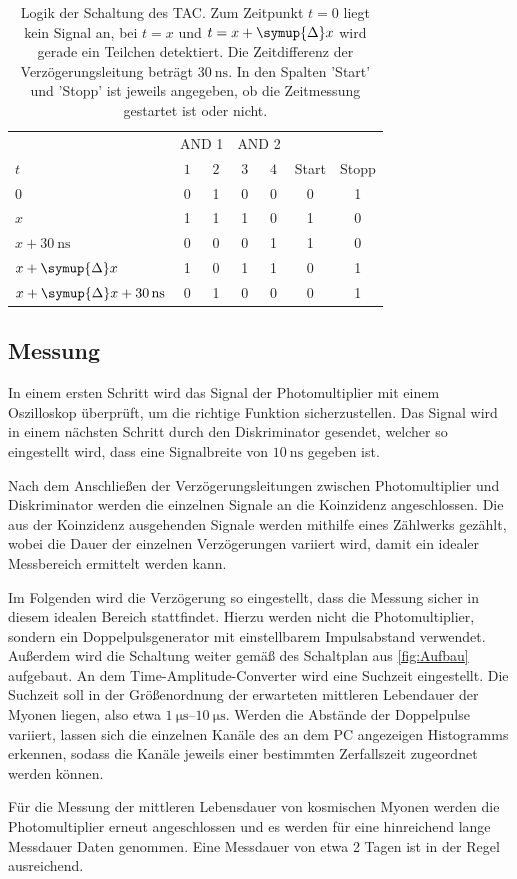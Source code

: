  \begin{table}
    \centering
    \caption{Logik der Schaltung des TAC. Zum Zeitpunkt $t=0$ liegt kein Signal an, bei $t=x$ und $t=x+\symup{\Delta}x$ wird gerade ein Teilchen detektiert. %
    Die Zeitdifferenz der Verzögerungsleitung beträgt $\qty{30}{\nano\second}$. In den Spalten 'Start' und 'Stopp' ist jeweils angegeben, ob die Zeitmessung %
    gestartet ist oder nicht.}
    \label{tab:Logik}
    \begin{tabular}{l | c c | c c | c c}
      \toprule
      {} & \multicolumn{2}{c|}{AND 1} & \multicolumn{2}{c|}{AND 2} & {} & {} \\
      $t$ & $1$ & $2$ & $3$ & $4$ & Start & Stopp \\
      \midrule
      $0$                                               & 0 & 1 & 0 & 0 & 0 & 1 \\
      $x$                                               & 1 & 1 & 1 & 0 & 1 & 0 \\
      {$x + \qty{30}{\nano\second}$}                    & 0 & 0 & 0 & 1 & 1 & 0 \\
      {$x + \symup{\Delta}x$}                           & 1 & 0 & 1 & 1 & 0 & 1 \\
      {$x + \symup{\Delta}x + \qty{30}{\nano\second}$}  & 0 & 1 & 0 & 0 & 0 & 1 \\      
      
      \bottomrule
    \end{tabular}
  \end{table}

  \subsection{Messung}
  \label{subsec:Messung}
  In einem ersten Schritt wird das Signal der Photomultiplier mit einem Oszilloskop überprüft, um die richtige Funktion sicherzustellen. Das Signal wird in einem nächsten Schritt durch den
  Diskriminator gesendet, welcher so eingestellt wird, dass eine Signalbreite von $\qty{10}{\nano\second}$ gegeben ist.

  Nach dem Anschließen der Verzögerungsleitungen zwischen Photomultiplier und Diskriminator werden die einzelnen Signale an die Koinzidenz angeschlossen. Die aus der Koinzidenz ausgehenden
  Signale werden mithilfe eines Zählwerks gezählt, wobei die Dauer der einzelnen Verzögerungen variiert wird, damit ein idealer Messbereich ermittelt werden kann.

  Im Folgenden wird die Verzögerung so eingestellt, dass die Messung sicher in diesem idealen Bereich stattfindet. Hierzu werden nicht die Photomultiplier, sondern
  ein Doppelpulsgenerator mit einstellbarem Impulsabstand verwendet. Außerdem wird die Schaltung weiter gemäß des Schaltplan aus \autoref{fig:Aufbau} aufgebaut. An dem 
  Time-Amplitude-Converter wird eine Suchzeit eingestellt. Die Suchzeit soll in der Größenordnung der erwarteten mittleren Lebendauer der Myonen liegen, also etwa $\qtyrange{1}{10}{\micro\second}$.
  Werden die Abstände der Doppelpulse variiert, lassen sich die einzelnen Kanäle des an dem PC angezeigen Histogramms erkennen, sodass die Kanäle jeweils einer bestimmten Zerfallszeit
  zugeordnet werden können.

  Für die Messung der mittleren Lebensdauer von kosmischen Myonen werden die Photomultiplier erneut angeschlossen und es werden für eine hinreichend lange Messdauer Daten genommen. Eine
  Messdauer von etwa 2 Tagen ist in der Regel ausreichend.
